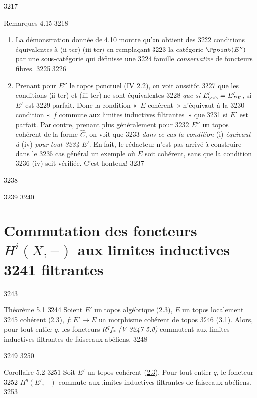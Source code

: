   3217	\begin{enonce*}[remark]{Remarques 4.15}
  3218	\begin{enumerate}
  3219	\renewcommand{\theenumi}{\alph{enumi}}
  3220	\renewcommand{\labelenumi}{\theenumi)}
  3221	\item La démonstration donnée de \hyperref[VI.prop4.10]{4.10} montre qu'on obtient des
  3222	  conditions équivalentes à (ii ter) \resp (iii ter) en remplaçant
  3223	  la catégorie $\Ppoint(E'')$ par une sous-catégorie qui définisse une
  3224	  famille \emph{conservative} de foncteurs fibres.
  3225	
  3226	\item Prenant pour $E''$ le topos ponctuel (IV 2.2), on voit aussitôt
  3227	  que les conditions (ii ter) et (iii ter) ne sont équivalentes
  3228	  \emph{que si} $E'_{\coh} = E'_{PF}$, \ie si $E'$ est
  3229	  parfait. Donc la condition « $E$ cohérent » n'équivaut à la
  3230	  condition « $f$ commute aux limites inductives filtrantes » que
  3231	  si $E'$ est parfait. Par contre, prenant plus généralement pour
  3232	  $E''$ un topos cohérent de la forme $\widehat{C}$, on voit que
  3233	  \emph{dans ce cas la condition} (i) \emph{équivaut à} (iv) \emph{pour tout
  3234	  $E'$}. En fait, le rédacteur n'est pas arrivé à construire dans le
  3235	  cas général un exemple où $E$ soit cohérent, sans que la condition
  3236	  (iv) soit vérifiée. C'est honteux!
  3237	\end{enumerate}
  3238	\end{enonce*}
  3239	
  3240	\section{Commutation des foncteurs $H^i(X, -)$ aux limites inductives
  3241	  filtrantes}	
  3243	\begin{enonce*}{Théorème 5.1}
  3244	Soient $E'$ un topos algébrique (\hyperref[VI.def2.3]{2.3}), $E$ un topos localement
  3245	cohérent (\hyperref[VI.def2.3]{2.3}), $f : E' \to E$ un morphisme cohérent de topos
  3246	(\hyperref[VI.def3.1]{3.1}). Alors, pour tout entier $q$, les foncteurs $R^q f_{\ast}$ \emph{(V
  3247	5.0)} commutent aux limites inductives filtrantes de faisceaux abéliens.
  3248	\end{enonce*}
  3249	
  3250	\begin{enonce*}{Corollaire 5.2}
  3251	Soit $E'$ un topos cohérent (\hyperref[VI.def2.3]{2.3}). Pour tout entier $q$, le foncteur
  3252	$H^q(E', -)$ commute aux limites inductives filtrantes de faisceaux abéliens.
  3253	\end{enonce*}
